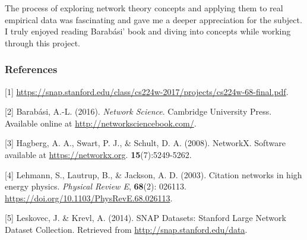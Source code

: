\documentclass{article}
\begin{document}
The process of exploring network theory concepts and applying them to real empirical data was fascinating and gave me a deeper appreciation for the subject. I truly enjoyed reading Barabási’ book and diving into concepts while working through this project.

\subsubsection*{References}
\small{
[1] \url{https://snap.stanford.edu/class/cs224w-2017/projects/cs224w-68-final.pdf}.

[2] Barabási, A.-L. (2016). {\it Network Science}. Cambridge University Press. Available online at \url{http://networksciencebook.com/}.

[3] Hagberg, A. A., Swart, P. J., \& Schult, D. A. (2008). NetworkX. Software available at \url{https://networkx.org}.
{\bf 15}(7):5249-5262.

[4] Lehmann, S., Lautrup, B., \& Jackson, A. D. (2003). Citation networks in high energy physics. {\it Physical Review E}, {\bf 68}(2): 026113. \url{https://doi.org/10.1103/PhysRevE.68.026113}.

[5] Leskovec, J. \& Krevl, A. (2014). SNAP Datasets: Stanford Large Network Dataset Collection. Retrieved from \url{http://snap.stanford.edu/data}.

}
\end{document}
